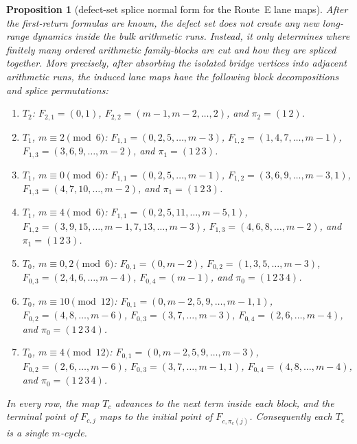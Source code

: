 \documentclass[11pt]{article}
\newtheorem{proposition}{Proposition}
\begin{document}
\begin{proposition}[defect-set splice normal form for the Route~E lane maps]\label{prop:routeE-splice}
After the first-return formulas are known, the defect set does not create any new long-range dynamics inside the bulk arithmetic runs.
Instead, it only determines where finitely many ordered arithmetic family-blocks are cut and how they are spliced together.
More precisely, after absorbing the isolated bridge vertices into adjacent arithmetic runs, the induced lane maps have the following block decompositions and splice permutations:

{\small
\begin{enumerate}[label=\textup{(\roman*)},leftmargin=2.4em,itemsep=0.25em,topsep=0.35em]
\item $T_2$: $F_{2,1}=(0,1)$, $F_{2,2}=(m-1,m-2,\dots,2)$, and $\pi_2=(1\,2)$.
\item $T_1$, $m\equiv 2\pmod 6$: $F_{1,1}=(0,2,5,\dots,m-3)$, $F_{1,2}=(1,4,7,\dots,m-1)$, $F_{1,3}=(3,6,9,\dots,m-2)$, and $\pi_1=(1\,2\,3)$.
\item $T_1$, $m\equiv 0\pmod 6$: $F_{1,1}=(0,2,5,\dots,m-1)$, $F_{1,2}=(3,6,9,\dots,m-3,1)$, $F_{1,3}=(4,7,10,\dots,m-2)$, and $\pi_1=(1\,2\,3)$.
\item $T_1$, $m\equiv 4\pmod 6$: $F_{1,1}=(0,2,5,11,\dots,m-5,1)$, $F_{1,2}=(3,9,15,\dots,m-1,7,13,\dots,m-3)$, $F_{1,3}=(4,6,8,\dots,m-2)$, and $\pi_1=(1\,2\,3)$.
\item $T_0$, $m\equiv 0,2\pmod 6$: $F_{0,1}=(0,m-2)$, $F_{0,2}=(1,3,5,\dots,m-3)$, $F_{0,3}=(2,4,6,\dots,m-4)$, $F_{0,4}=(m-1)$, and $\pi_0=(1\,2\,3\,4)$.
\item $T_0$, $m\equiv 10\pmod{12}$: $F_{0,1}=(0,m-2,5,9,\dots,m-1,1)$, $F_{0,2}=(4,8,\dots,m-6)$, $F_{0,3}=(3,7,\dots,m-3)$, $F_{0,4}=(2,6,\dots,m-4)$, and $\pi_0=(1\,2\,3\,4)$.
\item $T_0$, $m\equiv 4\pmod{12}$: $F_{0,1}=(0,m-2,5,9,\dots,m-3)$, $F_{0,2}=(2,6,\dots,m-6)$, $F_{0,3}=(3,7,\dots,m-1,1)$, $F_{0,4}=(4,8,\dots,m-4)$, and $\pi_0=(1\,2\,3\,4)$.
\end{enumerate}
}

In every row, the map $T_c$ advances to the next term inside each block, and the terminal point of $F_{c,j}$ maps to the initial point of $F_{c,\pi_c(j)}$.
Consequently each $T_c$ is a single $m$-cycle.
\end{proposition}
\end{document}
